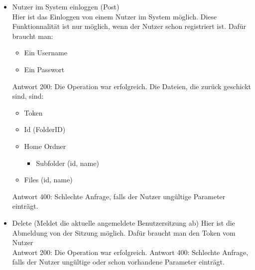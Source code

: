 \begin{enumerate}
\begin{itemize}
\item Nutzer im System einloggen (Post) \\
Hier ist das Einloggen von einem Nutzer im System m\"oglich. Diese Funktionnalit\"at ist nur m\"oglich, wenn der Nutzer schon registriert ist. Daf\"ur braucht man: 
\begin{itemize}
\item Ein Username 
\item Ein Passwort 
\end{itemize}
Antwort 200: Die Operation war erfolgreich. Die Dateien, die zur\"uck geschickt sind, sind:
\begin{itemize}
\item Token
\item Id (FolderID)
\item Home Ordner
	\begin{itemize}
	\item Subfolder (id, name)
	\end{itemize}
	\item Files (id, name)
\end{itemize}
Antwort 400: Schlechte Anfrage, falls der Nutzer ung\"ultige Parameter eintr\"agt. 
\item Delete (Meldet die aktuelle angemeldete Benutzersitzung ab)
Hier ist die Abmeldung von der Sitzung m\"oglich. Daf\"ur braucht man den Token vom Nutzer \\
Antwort 200: Die Operation war erfolgreich. 
Antwort 400: Schlechte Anfrage, falls der Nutzer ung\"ultige oder schon vorhandene Parameter eintr\"agt. 
\end{itemize}


\end{enumerate}
